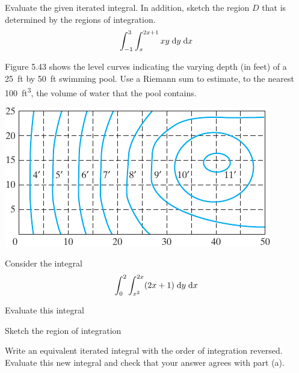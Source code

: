 \documentclass[boxes]{gsypset}
\begin{document}
	\begin{problem}[5.2.7]
		Evaluate the given iterated integral.
		In addition, sketch the region $D$ that is determined by the regions of integration.
		\[
			\int_{-1}^3 \int_x^{2x+1} xy \;\mathrm{d}y \;\mathrm{d}x
		\]
	\end{problem}
	\begin{solution}
		
	\end{solution}
	
	\begin{problem}[5.2.14]
		Figure 5.43 shows the level curves indicating the varying depth (in feet) of a 
		\SI{25}{ft} by \SI{50}{ft} swimming pool. 
		Use a Riemann sum to estimate, to the nearest \SI{100}{ft^3}, 
		the volume of water that the pool contains.
		\begin{center}
			\includegraphics{img/5_2_14}
			\renewcommand{\thefigure}{5.43}
		\end{center}
	\end{problem}
	\begin{solution}
		
	\end{solution}
	
	\begin{problem}[5.3.1]
		Consider the integral
		\[
			\int_0^2 \int_{x^2}^{2x} (2x + 1) \;\mathrm{d}y \;\mathrm{d}x
		\]
		\begin{subproblems}
			\subproblem Evaluate this integral
				\begin{solution}
					
				\end{solution}
			\subproblem Sketch the region of integration
				\begin{solution}
					
				\end{solution}
			\subproblem
				Write an equivalent iterated integral with the order of integration reversed. 
				Evaluate this new integral and check that your answer agrees with part (a).
				\begin{solution}
					
				\end{solution}
		\end{subproblems}
	\end{problem}
	
\end{document}

